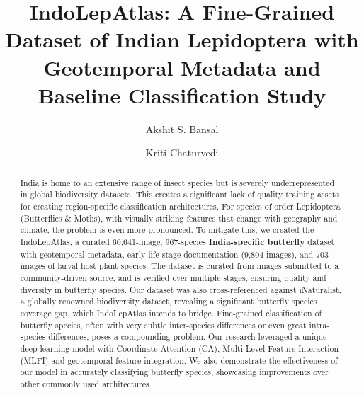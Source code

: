 \documentclass[runningheads]{llncs}
\begin{document}
%
\title{IndoLepAtlas: A Fine-Grained Dataset of Indian Lepidoptera with Geotemporal Metadata and Baseline Classification Study}
%
%
%
\author{
Akshit S. Bansal \and
Kriti Chaturvedi
}
%
%
\maketitle

\begin{abstract}
India is home to an extensive range of insect species but is severely underrepresented in global biodiversity datasets. This creates a significant lack of quality training assets for creating region-specific classification architectures. For species of order Lepidoptera (Butterflies \& Moths), with visually striking features that change with geography and climate, the problem is even more pronounced. To mitigate this, we created the IndoLepAtlas, a curated 60,641-image, 967-species \textbf{India-specific butterfly} dataset with geotemporal metadata, early life-stage documentation (9,804 images), and 703 images of larval host plant species. The dataset is curated from images submitted to a community-driven source, and is verified over multiple stages, ensuring quality and diversity in butterfly species. Our dataset was also cross-referenced against iNaturalist, a globally renowned biodiversity dataset, revealing a significant butterfly species coverage gap, which IndoLepAtlas intends to bridge. Fine-grained classification of butterfly species, often with very subtle inter-species differences or even great intra-species differences, poses a compounding problem. Our research leveraged a unique deep-learning model with Coordinate Attention (CA), Multi-Level Feature Interaction (MLFI) and geotemporal feature integration. We also demonstrate the effectiveness of our model in accurately classifying butterfly species, showcasing improvements over other commonly used architectures.


\end{abstract}
\end{document}
